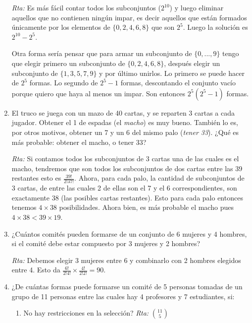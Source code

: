 \documentclass[12pt,spanish,makeidx]{amsbook}
\begin{document}
\begin{enumerate}
\noindent\textit{Rta:} Es más fácil contar todos los subconjuntos ($2^{10}$) y luego eliminar aquellos que no contienen ningún impar, es decir aquellos que están formados únicamente por los elementos de $\{0,2,4,6,8\}$ que son $2^5$. Luego la solución es $2^{10}-2^5$.

Otra forma sería pensar que para armar un subconjunto de $\{0,...,9\}$ tengo que elegir primero un subconjunto de $\{0,2,4,6,8\}$, después elegir un subconjunto de $\{1,3,5,7,9\}$ y por último unirlos. Lo primero se puede hacer de $2^5$ formas. Lo segundo de $2^5-1$ formas, descontando el conjunto vacío porque quiero que haya al menos un impar. Son entonces $2^5 (2^5 - 1)$ formas.

\medskip

\item El truco se juega con un mazo de 40 cartas, y se reparten 3 cartas a cada jugador. Obtener el 1 de espadas (el {\it macho}) es muy bueno. También lo es, por otros motivos, obtener un 7 y un 6 del mismo palo ({\it tener 33}). ¿Qué es más probable: obtener el macho, o tener 33?

\noindent\textit{Rta:} Si contamos todos los subconjuntos de 3 cartas una de las cuales es el macho, tendremos que son todos los subconjuntos de dos cartas entre las 39 restantes esto es $\frac{39!}{2!37!}$.
Ahora, para cada palo, la cantidad de subconjuntos de 3 cartas, de entre las cuales 2 de ellas son el 7 y el 6 correspondientes, son exactamente 38 (las posibles cartas restantes). Esto para cada palo entonces tenemos $4\times 38$ posibilidades. Ahora bien, es más probable el macho pues $4\times 38< 39\times 19$. 

\medskip

\item ¿Cuántos comités pueden formarse de un conjunto de 6 mujeres y 4 hombres, si el comité debe estar compuesto por 3 mujeres y 2 hombres?

\noindent\textit{Rta:} Debemos elegir 3 mujeres entre 6 y combinarlo con 2 hombres elegidos entre 4. Esto da $\frac{6!}{2!4!}\times \frac{4!}{2!2!}=90$.

\medskip

\item ¿De cuántas formas puede formarse un comité de 5 personas tomadas de un grupo
de 11 personas entre las cuales hay 4 profesores y 7 estudiantes, si:
\begin{enumerate}
\item 
No hay restricciones en la selección?
\noindent\textit{Rta:}  $\binom{11}{5}$


\end{enumerate}
\end{enumerate}
\end{document}
